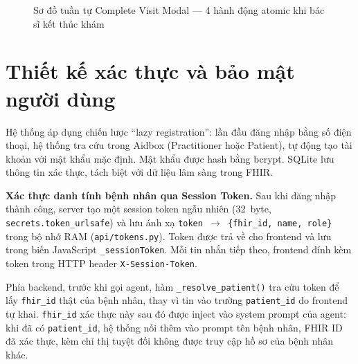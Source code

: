 \documentclass[a4paper,13pt,3p,oneside]{report}
\theoremstyle{definition}
\theoremstyle{remark}
\theoremstyle{definition}
\begin{document}
\begin{figure}[H]
\caption{Sơ đồ tuần tự Complete Visit Modal --- 4 hành động atomic khi bác sĩ kết thúc khám}
\label{fig:seq-flow-complete}
\end{figure}

\section{Thiết kế xác thực và bảo mật người dùng}

Hệ thống áp dụng chiến lược ``lazy registration'': lần đầu đăng nhập bằng số điện thoại, hệ thống tra cứu trong Aidbox (Practitioner hoặc Patient), tự động tạo tài khoản với mật khẩu mặc định. Mật khẩu được hash bằng bcrypt. SQLite lưu thông tin xác thực, tách biệt với dữ liệu lâm sàng trong FHIR.

\textbf{Xác thực danh tính bệnh nhân qua Session Token.}
Sau khi đăng nhập thành công, server tạo một session token ngẫu nhiên (32~byte, \texttt{secrets.token\_urlsafe}) và lưu ánh xạ \texttt{token~$\rightarrow$~\{fhir\_id, name, role\}} trong bộ nhớ RAM (\texttt{api/tokens.py}). Token được trả về cho frontend và lưu trong biến JavaScript \texttt{\_sessionToken}. Mỗi tin nhắn tiếp theo, frontend đính kèm token trong HTTP header \texttt{X-Session-Token}.

Phía backend, trước khi gọi agent, hàm \texttt{\_resolve\_patient()} tra cứu token để lấy \texttt{fhir\_id} thật của bệnh nhân, thay vì tin vào trường \texttt{patient\_id} do frontend tự khai. \texttt{fhir\_id} xác thực này sau đó được inject vào system prompt của agent: khi đã có \texttt{patient\_id}, hệ thống nối thêm vào prompt tên bệnh nhân, FHIR ID đã xác thực, kèm chỉ thị tuyệt đối không được truy cập hồ sơ của bệnh nhân khác.
\end{document}
